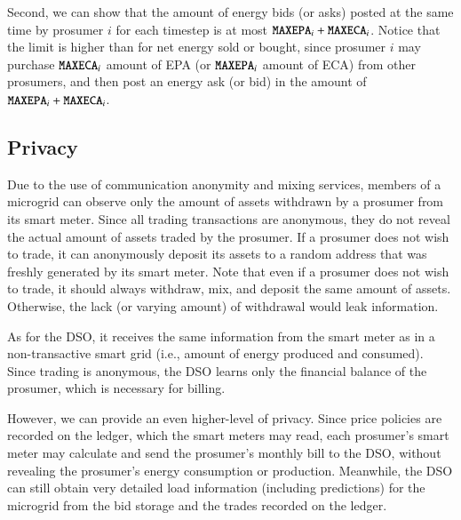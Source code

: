 Second, we can show that the amount of energy bids (or asks) posted at the same time by prosumer $i$ for each timestep is at most $\texttt{MAXEPA}_i + \texttt{MAXECA}_i$.
Notice that the limit is higher than for net energy sold or bought, since prosumer $i$ may purchase $\texttt{MAXECA}_i$ amount of EPA (or $\texttt{MAXEPA}_i$ amount of ECA) from other prosumers, and then post an energy ask (or bid) in the amount of $\texttt{MAXEPA}_i + \texttt{MAXECA}_i$.

\subsection{Privacy}
Due to the use of communication anonymity and mixing services, members of a microgrid can observe only the amount of assets withdrawn by a prosumer from its smart meter. %
Since all trading transactions are anonymous, they do not reveal the actual amount of assets traded by the prosumer.
If a prosumer does not wish to trade, it can anonymously deposit its assets to a random address that was freshly generated by its smart meter.
Note that even if a prosumer does not wish to trade, it should always withdraw, mix, and deposit the same amount of assets.
Otherwise, the lack (or varying amount) of withdrawal would leak information.

As for the DSO, it receives the same information from the smart meter as in a non-transactive smart grid (i.e., amount of energy produced and consumed).
Since trading is anonymous, the DSO learns only the financial balance of the prosumer, which is necessary for billing.

However, we can provide an even higher-level of privacy.
Since price policies are recorded on the ledger, which the smart meters may read, each prosumer's smart meter may calculate and send the prosumer's monthly bill to the DSO, without revealing the prosumer's energy consumption or production.
Meanwhile, the DSO can still obtain very detailed load information (including predictions) for the microgrid from the bid storage and the trades recorded on the ledger.

